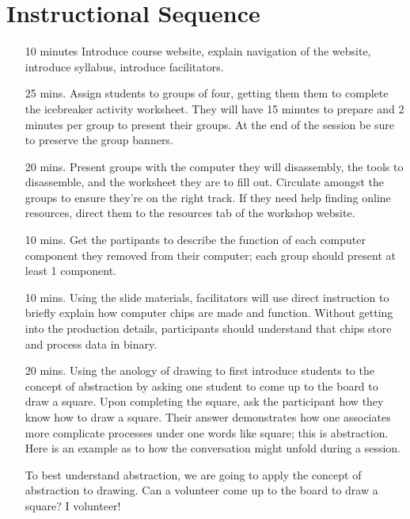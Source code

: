 \documentclass[11pt]{article}
\begin{document}
  \section*{Instructional Sequence}
  \begin{itemize}
    \item[10 minutes] Introduce course website, explain navigation of the
      website, introduce syllabus, introduce facilitators.
    \item[25 mins.] Assign students to groups of four, getting them them to complete the icebreaker activity worksheet. They will have 15 minutes to prepare and 2
      minutes per group to present their groups. At the end of the session be
      sure to preserve the group banners.
    \item[20 mins.] Present groups with the computer they will disassembly,
      the tools to disassemble, and the worksheet they are to fill out.
      Circulate amongst the groups to ensure they're on the right track. If
      they need help finding online resources, direct them to the resources tab of the
      workshop website. 
    \item[10 mins.] Get the partipants to describe the function of each
      computer component they removed from their computer; each group should
      present at least 1 component.
    \item[10 mins.] Using the slide materials, facilitators will use direct
      instruction to briefly explain how computer chips are made and function.
      Without getting into the production details, participants should
      understand that chips store and process data in binary.
    \item[20 mins.] Using the anology of drawing to first introduce students to
      the concept of abstraction by asking one student to come up to the board to
      draw a square. Upon completing the square, ask the participant how they
      know how to draw a square. Their answer demonstrates how one associates more complicate processes under one words
      like square; this is abstraction. Here is an example as to how the
      conversation might unfold during a session.
      \begin{dialogue}
         To best understand abstraction, we are going to
        apply the concept of abstraction to drawing. Can a volunteer come up to
        the board to draw a square?
         I volunteer!



\end{dialogue}
\end{itemize}
\end{document}
